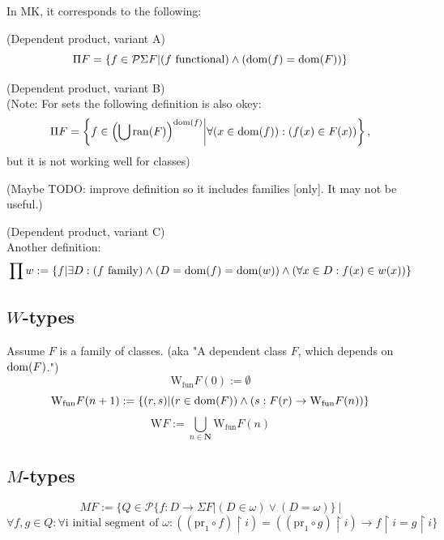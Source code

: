 In MK, it corresponds to the following:

\begin{definition}(Dependent product, variant A)
\[
\Pi F = \{f\in \mathcal{P} \Sigma F | (f\mathrm{\ functional}) \land (\mathrm{dom}(f)=\mathrm{dom}(F)) \}
\]
\end{definition}

\begin{definition}(Dependent product, variant B)\\
(Note: For sets the following definition is also okey:
\[
\Pi F = \left\{f\in \left(\bigcup\mathrm{ran}(F)\right)^{\mathrm{dom}(f)} \middle| \forall (x\in\mathrm{dom}(f)) : (f(x) \in F(x)) \right\},
\]
but it is not working well for classes)

(Maybe TODO: improve definition so it includes families [only]. It may not be useful.)
\end{definition}

\begin{definition}(Dependent product, variant C)\\
Another definition:\\
\[
\prod w := \{f | \exists D: (f\mathrm{\ family}) \land (D = \mathrm{dom}(f)=\mathrm{dom}(w)) \land (\forall x\in D: f(x) \in w(x)) \}
\]
\end{definition}

\begin{theorem}

\end{theorem}



\subsection{$W$-types}
Assume $F$ is a family of classes. (aka "A dependent class $F$, which depends on $\mathrm{dom}(F)$.")
\[
\mbox{W}_{\mathrm{fun}}F(0):= \emptyset 
\]
\[
\mbox{W}_{\mathrm{fun}}F(n+1):= \{(r,s)| (r\in \mathrm{dom}(F))\land (s:F(r)\to \mbox{W}_{\mathrm{fun}}F(n) )\}
\]
\[
\mbox{W}F :=\bigcup_{n\in\textbf{N}} \mbox{W}_{\mathrm{fun}}F(n)
\]
\subsection{$M$-types}
\[
MF := \{Q\in\mathcal{P}\{f:D \to\Sigma F| (D\in\omega)\lor(D=\omega)\}\ | 
\]
\[
\forall f,g\in Q: \forall \mbox{i initial segment of }\omega: ((\mathrm{pr}_1 \circ f)\restriction i)=((\mathrm{pr}_1 \circ g) \restriction i) \longrightarrow f \restriction i =  g \restriction i\}
\]

